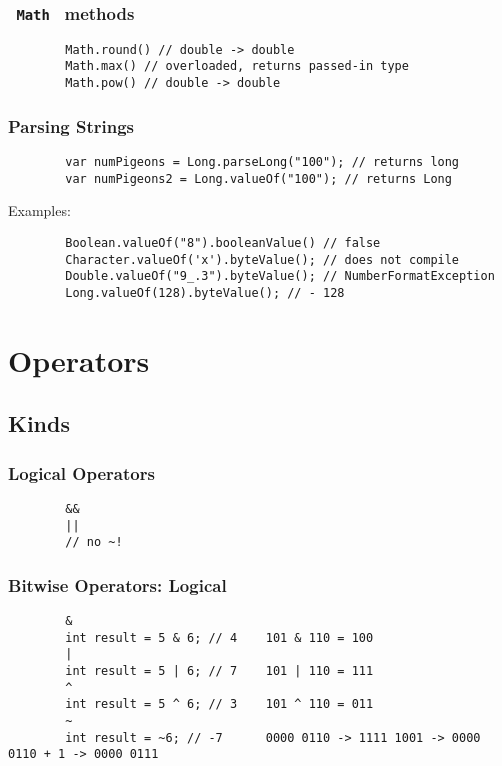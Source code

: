 \documentclass{scrartcl}
\begin{document}
\subsubsection{\lstinline$ Math $ methods}
    \begin{lstlisting}
        Math.round() // double -> double
        Math.max() // overloaded, returns passed-in type
        Math.pow() // double -> double
    \end{lstlisting}

\subsubsection{Parsing Strings}
    \begin{lstlisting}
        var numPigeons = Long.parseLong("100"); // returns long
        var numPigeons2 = Long.valueOf("100"); // returns Long
    \end{lstlisting}

    Examples:
    \begin{lstlisting}
        Boolean.valueOf("8").booleanValue() // false
        Character.valueOf('x').byteValue(); // does not compile
        Double.valueOf("9_.3").byteValue(); // NumberFormatException
        Long.valueOf(128).byteValue(); // - 128
    \end{lstlisting}

\section{Operators}
\subsection{Kinds}
\subsubsection{Logical Operators}
    \begin{lstlisting}
        &&
        ||
        // no ~!
    \end{lstlisting}

\subsubsection{Bitwise Operators: Logical}
    \begin{lstlisting}
        &
        int result = 5 & 6; // 4    101 & 110 = 100
        |
        int result = 5 | 6; // 7    101 | 110 = 111
        ^
        int result = 5 ^ 6; // 3    101 ^ 110 = 011
        ~
        int result = ~6; // -7      0000 0110 -> 1111 1001 -> 0000 0110 + 1 -> 0000 0111
    \end{lstlisting}
\end{document}
